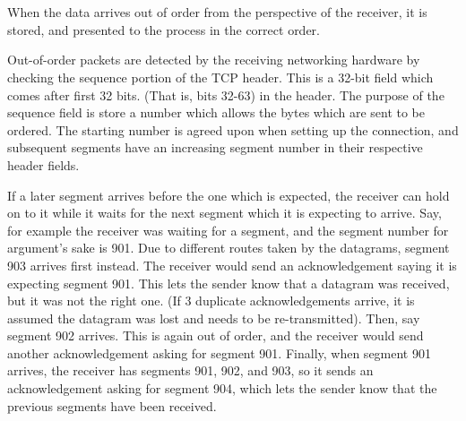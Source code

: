 \section{}
When the data arrives out of order from the perspective of the receiver, it is
stored, and presented to the process in the correct order. 

Out-of-order packets are detected by the receiving networking hardware by
checking the sequence portion of the TCP header. This is a 32-bit field which
comes after first 32 bits. (That is, bits 32-63) in the header.
The purpose of the sequence field is store a number which allows the
bytes which are sent to be ordered. The starting number is agreed upon
when setting up the connection, and subsequent segments have an increasing
segment number in their respective header fields. 

If a later
segment arrives before the one which is expected, the receiver can hold on to it
while it waits for the next segment which it is expecting to arrive. 
Say, for example the receiver was waiting for a segment, and the segment number
for argument's sake is 901. Due to different routes taken by the datagrams,
segment 903 arrives first instead. The receiver would send an acknowledgement
saying it is expecting segment 901. This lets the sender know that a datagram
was received, but it was not the right one. (If 3 duplicate acknowledgements
arrive, it is assumed the datagram was lost and needs to be re-transmitted).
Then, say segment 902 arrives. This is again out of order, and the receiver
would send another acknowledgement asking for segment 901. Finally, when segment
901 arrives, the receiver has segments 901, 902, and 903, so it sends an
acknowledgement asking for segment 904, which lets the sender know that the
previous segments have been received.
